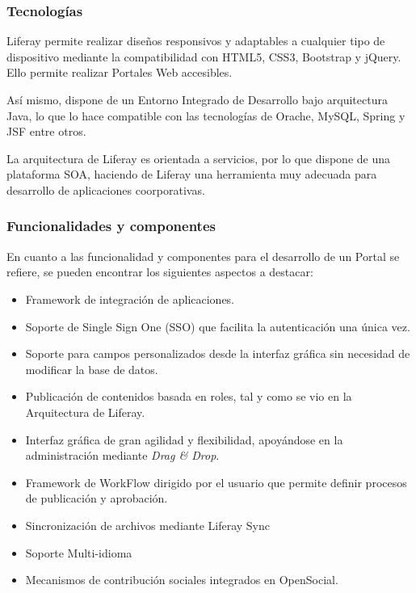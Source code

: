 \subsubsection{Tecnologías}
\par Liferay permite realizar diseños responsivos y adaptables a cualquier tipo de dispositivo mediante la compatibilidad con HTML5, CSS3, Bootstrap y jQuery. Ello permite realizar Portales Web accesibles.
\par Así mismo, dispone de un Entorno Integrado de Desarrollo bajo arquitectura Java, lo que lo hace compatible con las tecnologías de Orache, MySQL, Spring y JSF entre otros.
\par La arquitectura de Liferay es orientada a servicios, por lo que dispone de una plataforma SOA, haciendo de Liferay una herramienta muy adecuada para desarrollo de aplicaciones coorporativas.
\subsubsection{Funcionalidades y componentes}
\par En cuanto a las funcionalidad y componentes para el desarrollo de un Portal se refiere, se pueden encontrar los siguientes aspectos a destacar:
\begin{itemize}
    \item Framework de integración de aplicaciones.
    \item Soporte de Single Sign One (SSO) que facilita la autenticación una única vez.
    \item Soporte para campos personalizados desde la interfaz gráfica sin necesidad de modificar la base de datos.
    \item Publicación de contenidos basada en roles, tal y como se vio en la Arquitectura de Liferay.
    \item Interfaz gráfica de gran agilidad y flexibilidad, apoyándose en la administración mediante \textit{Drag \& Drop}.
    \item Framework de WorkFlow dirigido por el usuario que permite definir procesos de publicación y aprobación.
    \item Sincronización de archivos mediante Liferay Sync
    \item Soporte Multi-idioma
    \item Mecanismos de contribución sociales integrados en OpenSocial.
\end{itemize}

